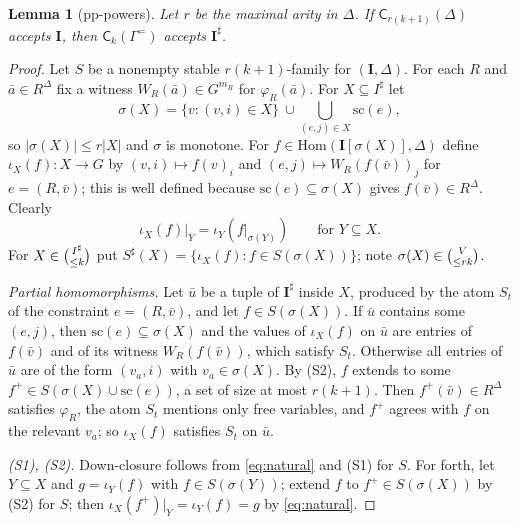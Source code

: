 \documentclass[11pt]{article}
\newtheorem{lemma}[theorem]{Lemma}
\theoremstyle{definition}
\theoremstyle{remark}
\newcommand{\Hom}{\mathrm{Hom}}
\newcommand{\Coh}{\mathsf{C}}
\newcommand{\sub}[2]{\tbinom{#1}{\le #2}}
\begin{document}
\begin{lemma}[pp-powers]\label{lem:power}
Let $r$ be the maximal arity in $\Delta$. If $\Coh_{r(k+1)}(\Delta)$ accepts
$\mathbf I$, then $\Coh_k(\Gamma^{=})$ accepts $\mathbf I^\sharp$.
\end{lemma}
\begin{proof}
Let $S$ be a nonempty stable $r(k+1)$-family for $(\mathbf I,\Delta)$. For
each $R$ and $\bar a\in R^\Delta$ fix a witness $W_R(\bar a)\in G^{m_R}$ for
$\varphi_R(\bar a)$. For $X\subseteq I^\sharp$ let
\[
\sigma(X)=\{v:(v,i)\in X\}\ \cup\bigcup_{(e,j)\in X}\mathrm{sc}(e),
\]
so $|\sigma(X)|\le r|X|$ and $\sigma$ is monotone. For
$f\in\Hom(\mathbf I[\sigma(X)],\Delta)$ define $\iota_X(f)\colon X\to G$ by
$(v,i)\mapsto f(v)_i$ and $(e,j)\mapsto W_R(f(\bar v))_j$ for $e=(R,\bar v)$;
this is well defined because $\mathrm{sc}(e)\subseteq\sigma(X)$ gives
$f(\bar v)\in R^\Delta$. Clearly
\begin{equation}\label{eq:natural}
\iota_X(f)|_Y=\iota_Y(f|_{\sigma(Y)})\qquad\text{for } Y\subseteq X.
\end{equation}
For $X\in\sub{I^\sharp}k$ put $S^\sharp(X)=\{\iota_X(f): f\in
S(\sigma(X))\}$; note $\sigma(X)\in\sub{V}{rk}$.

\emph{Partial homomorphisms.} Let $\bar u$ be a tuple of $\mathbf I^\sharp$
inside $X$, produced by the atom $S_t$ of the constraint $e=(R,\bar v)$, and
let $f\in S(\sigma(X))$. If $\bar u$ contains some $(e,j)$, then
$\mathrm{sc}(e)\subseteq\sigma(X)$ and the values of $\iota_X(f)$ on $\bar u$
are entries of $f(\bar v)$ and of its witness $W_R(f(\bar v))$, which satisfy
$S_t$. Otherwise all entries of $\bar u$ are of the form $(v_a,i)$ with
$v_a\in\sigma(X)$. By (S2), $f$ extends to some
$f^+\in S(\sigma(X)\cup\mathrm{sc}(e))$, a set of size at most $r(k+1)$. Then
$f^+(\bar v)\in R^\Delta$ satisfies $\varphi_R$, the atom $S_t$ mentions only
free variables, and $f^+$ agrees with $f$ on the relevant $v_a$; so
$\iota_X(f)$ satisfies $S_t$ on $\bar u$.

\emph{(S1), (S2).} Down-closure follows from \eqref{eq:natural} and (S1) for
$S$. For forth, let $Y\subseteq X$ and $g=\iota_Y(f)$ with
$f\in S(\sigma(Y))$; extend $f$ to $f^+\in S(\sigma(X))$ by (S2) for $S$;
then $\iota_X(f^+)|_Y=\iota_Y(f)=g$ by \eqref{eq:natural}.


\end{proof}
\end{document}
